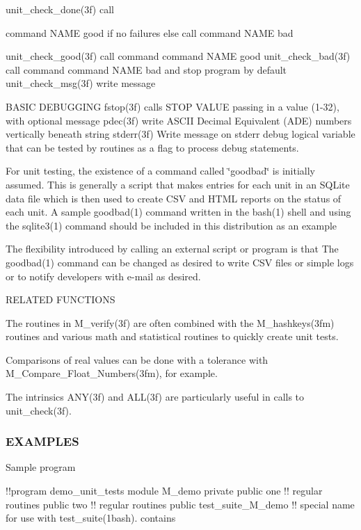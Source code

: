 unit\+\_\+check\+\_\+done(3f) call \begin{DoxyVerb}                      command NAME good
                   if no failures
                   else call
                      command NAME bad
\end{DoxyVerb}
 unit\+\_\+check\+\_\+good(3f) call command command N\+A\+ME good unit\+\_\+check\+\_\+bad(3f) call command command N\+A\+ME bad and stop program by default unit\+\_\+check\+\_\+msg(3f) write message

B\+A\+S\+IC D\+E\+B\+U\+G\+G\+I\+NG fstop(3f) calls \textquotesingle{}S\+T\+OP V\+A\+L\+UE\textquotesingle{} passing in a value (1-\/32), with optional message pdec(3f) write A\+S\+C\+II Decimal Equivalent (A\+DE) numbers vertically beneath string stderr(3f) Write message on stderr debug logical variable that can be tested by routines as a flag to process debug statements.

For unit testing, the existence of a command called \char`\"{}goodbad\char`\"{} is initially assumed. This is generally a script that makes entries for each unit in an S\+Q\+Lite data file which is then used to create C\+SV and H\+T\+ML reports on the status of each unit. A sample goodbad(1) command written in the bash(1) shell and using the sqlite3(1) command should be included in this distribution as an example

The flexibility introduced by calling an external script or program is that The goodbad(1) command can be changed as desired to write C\+SV files or simple logs or to notify developers with e-\/mail as desired.

R\+E\+L\+A\+T\+ED F\+U\+N\+C\+T\+I\+O\+NS

The routines in M\+\_\+verify(3f) are often combined with the M\+\_\+hashkeys(3fm) routines and various math and statistical routines to quickly create unit tests.

Comparisons of real values can be done with a tolerance with M\+\_\+\+Compare\+\_\+\+Float\+\_\+\+Numbers(3fm), for example.

The intrinsics A\+N\+Y(3f) and A\+L\+L(3f) are particularly useful in calls to unit\+\_\+check(3f).

\subsubsection*{E\+X\+A\+M\+P\+L\+ES}

Sample program

!!program demo\+\_\+unit\+\_\+tests module M\+\_\+demo private public one !! regular routines public two !! regular routines public test\+\_\+suite\+\_\+\+M\+\_\+demo !! special name for use with test\+\_\+suite(1bash). contains

